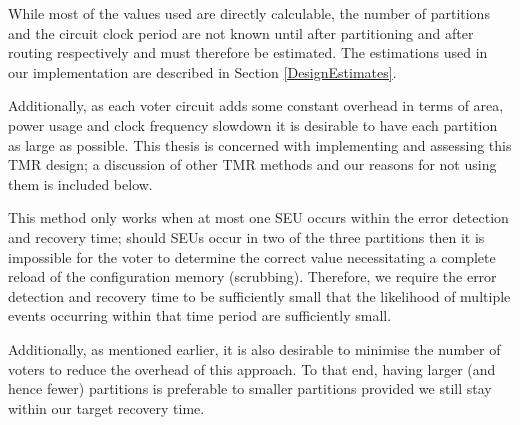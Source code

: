 \documentclass[12pt,final,oneside]{dwThesis} %
\begin{document}
   While most of the values used are directly calculable, the number of partitions and the circuit clock period are
   not known until after partitioning and after routing respectively and must therefore be estimated.
   The estimations used in our implementation are described in Section \ref{DesignEstimates}.


   Additionally, as each voter circuit adds some constant overhead in terms of
   area, power usage and clock frequency slowdown it is desirable to have each
   partition as large as possible. This thesis is concerned with implementing
   and assessing this \gls{TMR} design; a discussion of other \gls{TMR} methods
   and our reasons for not using them is included below.

   This method only works when at most one \gls{SEU} occurs within the error
   detection and recovery time; should \glspl{SEU} occur in two of the three
   partitions then it is impossible for the voter to determine the correct
   value necessitating a complete reload of the configuration memory
   (\gls{scrubbing}). Therefore, we require the error detection and recovery
   time to be sufficiently small that the likelihood of multiple events
   occurring within that time period are sufficiently small.

   Additionally, as mentioned earlier, it is also desirable to minimise the
   number of voters to reduce the overhead of this approach. To that end,
   having larger (and hence fewer) partitions is preferable to smaller
   partitions provided we still stay within our target recovery time.

\end{document}
